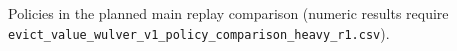 \begin{table}[t]
\centering
\caption{Policies in the planned main replay comparison (numeric results require \texttt{evict\_value\_wulver\_v1\_policy\_comparison\_heavy\_r1.csv}).}
\label{tab:policy-roster}

\end{table}
